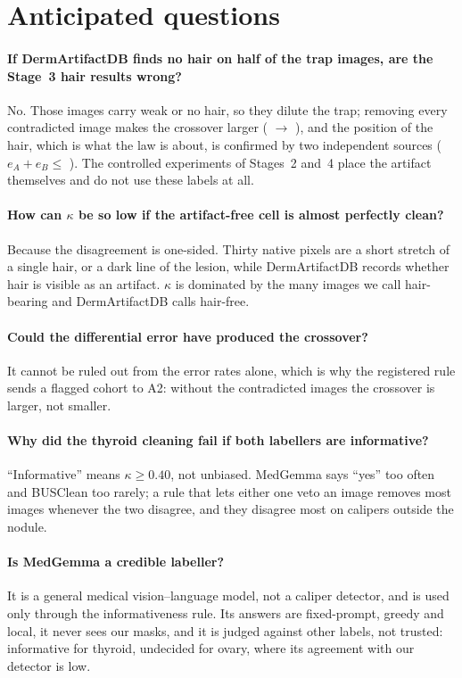 \section{Anticipated questions}
\paragraph{If DermArtifactDB finds no hair on half of the trap images, are the Stage~3 hair results wrong?} No. Those images
carry weak or no hair, so they dilute the trap; removing every contradicted image makes the crossover larger
(\sEightOrigisic{} $\to$ \sEightCleanisic), and the position of the hair, which is what the law is about, is confirmed
by two independent sources ($e_A+e_B\le$ \sEightImaeSum). The controlled experiments of Stages~2 and~4 place the artifact
themselves and do not use these labels at all.
\paragraph{How can $\kappa$ be so low if the artifact-free cell is almost perfectly clean?} Because the disagreement is
one-sided. Thirty native pixels are a short stretch of a single hair, or a dark line of the lesion, while DermArtifactDB
records whether hair is visible as an artifact. $\kappa$ is dominated by the many images we call hair-bearing and DermArtifactDB
calls hair-free.
\paragraph{Could the differential error have produced the crossover?} It cannot be ruled out from the error rates alone,
which is why the registered rule sends a flagged cohort to A2: without the contradicted images the crossover is larger,
not smaller.
\paragraph{Why did the thyroid cleaning fail if both labellers are informative?} ``Informative'' means $\kappa\ge0.40$, not
unbiased. MedGemma says ``yes'' too often and BUSClean too rarely; a rule that lets either one veto an image removes most
images whenever the two disagree, and they disagree most on calipers outside the nodule.
\paragraph{Is MedGemma a credible labeller?} It is a general medical vision--language model, not a caliper detector, and is
used only through the informativeness rule. Its answers are fixed-prompt, greedy and local, it never sees our masks, and it
is judged against other labels, not trusted: informative for thyroid, undecided for ovary, where its agreement with our
detector is low.
